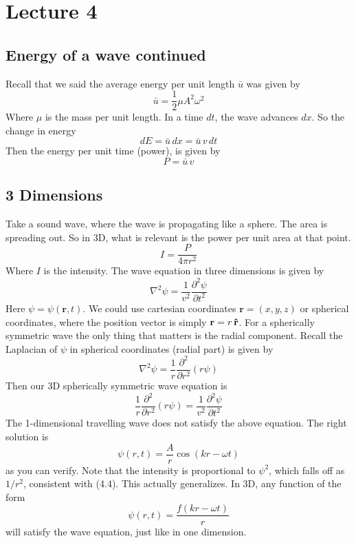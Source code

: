 \documentclass{report}
\numberwithin{equation}{section}
\begin{document}
\section{Lecture 4}
\subsection{Energy of a wave continued}
Recall that we said the average energy per unit length $\bar{u}$ was given by
\begin{equation}
	\bar{u} = \frac{1}{2}\mu A^2\omega^2
\end{equation}
Where $\mu$ is the mass per unit length. In a time $dt$, the wave advances $dx$. So the change in energy
\begin{equation}
	dE = \bar{u}\,dx = \bar{u}\,v\,dt
\end{equation}
Then the energy per unit time (power), is given by
\begin{equation}
	P = \bar{u}\,v
\end{equation}
\subsection{3 Dimensions}
Take a sound wave, where the wave is propagating like a sphere. The area is spreading out. So in 3D, what is relevant is the power per unit area at that point.
\begin{equation}
	I = \frac{P}{4\pi r^2}
\end{equation}
Where $I$ is the intensity. The wave equation in three dimensions is given by
\begin{equation}
	\nabla^2\psi = \frac{1}{v^2}\frac{\partial^2\psi}{\partial t^2}
\end{equation}
Here $\psi = \psi(\textbf{r},t)$. We could use cartesian coordinates $\textbf{r} = (x,y,z)$ or spherical coordinates, where the position vector is simply $\textbf{r} = r\,\vu{r}$. For a spherically symmetric wave the only thing that matters is the radial component. Recall the Laplacian of $\psi$ in spherical coordinates (radial part) is given by
\begin{equation*}
	\nabla^2\psi = \frac{1}{r}\frac{\partial^2}{\partial r^2}(r\psi)
\end{equation*}
Then our 3D spherically symmetric wave equation is
\begin{equation}
	\frac{1}{r}\frac{\partial^2}{\partial r^2}(r\psi) =\frac{1}{v^2}\frac{\partial^2\psi}{\partial t^2}
\end{equation}
The 1-dimensional travelling wave does not satisfy the above equation. The right solution is
\begin{equation}
	\psi(r,t) = \frac{A}{r}\cos(kr-\omega t)
\end{equation}
as you can verify. Note that the intensity is proportional to $\psi^2$, which falls off as $1/r^2$, consistent with (4.4). This actually generalizes. In 3D, any function of the form
\begin{equation}
		\psi(r,t) = \frac{f(kr - \omega t)}{r}
\end{equation}
will satisfy the wave equation, just like in one dimension.
\end{document}

